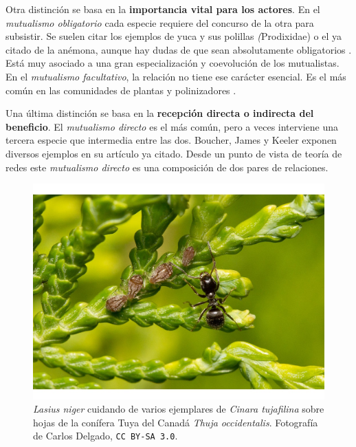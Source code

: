 Otra distinción se basa en la \textbf{importancia vital para los actores}. En el \textit{mutualismo obligatorio} cada especie requiere del concurso de la otra para subsistir. Se suelen citar los ejemplos de yuca y sus polillas \textit(Prodixidae) o el ya citado de la anémona, aunque hay dudas de que sean absolutamente obligatorios \cite{briand1982phylogenetic, addicott1995cheating}. Está muy asociado a una gran especialización y coevolución de los mutualistas. En el \textit{mutualismo facultativo}, la relación no tiene ese carácter esencial. Es el más común en las comunidades de plantas y polinizadores \cite{geib2012tracing}.

Una última distinción se basa en la \textbf{recepción directa o indirecta del beneficio}. El \textit{mutualismo directo} es el más común, pero a veces interviene una tercera especie que
intermedia entre las dos. Boucher, James y Keeler exponen diversos ejemplos en su artículo ya citado. Desde un punto de vista de teoría de redes este \textit{mutualismo directo} es una composición de dos pares de relaciones.


\begin{figure}[h!]
\centering
\includegraphics[scale=1]{Figures/INTRO_Lasius_niger_y_Cinara_tujafilina_en_Thuja_occidentalis.jpg}
\caption{\textit{Lasius niger} cuidando de varios ejemplares de \textit{Cinara tujafilina} sobre hojas de la conífera Tuya del Canadá \textit{Thuja occidentalis}. Fotografía de Carlos Delgado, \small{\texttt{CC BY-SA 3.0}}.}
\label{fig:INTRO_Lasius_niger_y_Cinara_tujafilina_en_Thuja_occidentalis}
\end{figure}

